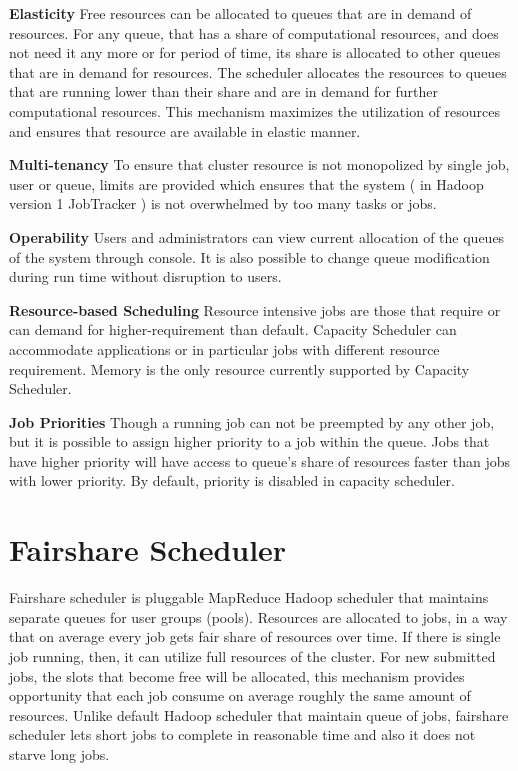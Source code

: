 \textbf{Elasticity } Free resources can be allocated to queues that are in demand of resources. For any queue, that has a share of computational resources, and does not need it any more or for period of time, its share is allocated to other queues that are in demand for resources. The scheduler allocates the resources to queues that are running lower than their share and are in demand for further computational resources. This mechanism maximizes the utilization of resources and ensures that resource are available in elastic manner. 


\textbf{Multi-tenancy } To ensure that cluster resource is not monopolized by single job, user or queue, limits are provided which ensures that the system ( in Hadoop version 1 JobTracker ) is not overwhelmed by too many tasks or jobs. 

\textbf{Operability } Users and administrators can view current allocation of the queues of the system through console. It is also possible to change queue modification during run time without disruption to users. 


\textbf{Resource-based Scheduling } Resource intensive jobs are those that require or can demand for higher-requirement than default. Capacity Scheduler can accommodate applications or in particular jobs with different resource requirement. Memory is the only resource currently supported by Capacity Scheduler. 

\textbf{Job Priorities } Though a running job can not be preempted by any other job, but it is possible to assign higher priority to a job within the queue. Jobs that have higher priority will have access to queue's share of resources faster than jobs with lower priority. By default, priority is disabled in capacity scheduler. 


\section{Fairshare Scheduler}

Fairshare scheduler is pluggable MapReduce Hadoop scheduler that maintains separate queues for user groups (pools). Resources are allocated to jobs, in a way that on average every job gets fair share of resources over time. If there is single job running, then, it can utilize full resources of the cluster. For new submitted jobs, the slots that become free will be allocated, this mechanism provides opportunity that each job consume on average roughly the same amount of resources. Unlike default Hadoop scheduler that maintain queue of jobs, fairshare scheduler lets short jobs to complete in reasonable time and also it does not starve long jobs.  \cite{dynamic} \cite{fair}\\

